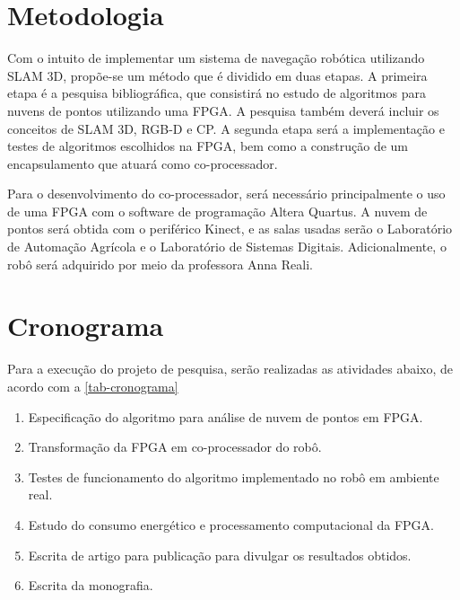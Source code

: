 	\chapter{Metodologia}\label{cap-metodologia}

	Com o intuito de implementar um sistema de navegação robótica utilizando SLAM 3D, propõe-se um método que é dividido em duas etapas. A primeira etapa é a pesquisa bibliográfica, que consistirá no estudo de algoritmos para nuvens de pontos utilizando uma FPGA. A pesquisa também deverá incluir os conceitos de SLAM 3D, RGB-D e CP. A segunda etapa será a implementação e testes de algoritmos escolhidos na FPGA, bem como a construção de um encapsulamento que atuará como co-processador.
	
	Para o desenvolvimento do co-processador, será necessário principalmente o uso de uma FPGA com o software de programação Altera Quartus. A nuvem de pontos será obtida com o periférico Kinect, e as salas usadas serão o Laboratório de Automação Agrícola e o Laboratório de Sistemas Digitais. Adicionalmente, o robô será adquirido por meio da professora Anna Reali.
	
	\chapter{Cronograma}\label{cap-cronograma}
	
	Para a execução do projeto de pesquisa, serão realizadas as atividades abaixo, de acordo com a \autoref{tab-cronograma}

	\begin{enumerate}
		\item Especificação do algoritmo para análise de nuvem de pontos em FPGA.
		\item Transformação da FPGA em co-processador do robô.
		\item Testes de funcionamento do algoritmo implementado no robô em ambiente real.
		\item Estudo do consumo energético e processamento computacional da FPGA.
		\item Escrita de artigo para publicação para divulgar os resultados obtidos.
		\item Escrita da monografia.
	\end{enumerate}

